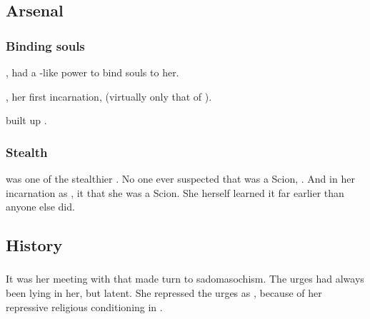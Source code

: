 \subsection{Arsenal}





\subsubsection{Binding souls}
\index{\carcer!\Shiaraid}
, \Shiaraid{} had a \sephirah-like power to bind souls to her. 

\Delphine{}, her first incarnation,  (virtually only that of \Eryal). 

\Belzir{} built up . 





\subsubsection{Stealth}
\Shiaraid{} was one of the stealthier \Malachim. 
No one ever suspected that \Delphine{} was a Scion, . 
And in her incarnation as \Belzir{}, it  that she was a Scion. 
She herself learned it far earlier than anyone else did. 








\subsection{History}





\subsubsection{\Semiza}
It was her meeting with \Semiza{} that made \Shiaraid{} turn to sadomasochism. 
The urges had always been lying in her, but latent.
She repressed the urges as , because of her repressive religious conditioning in \Merkyrah. 

